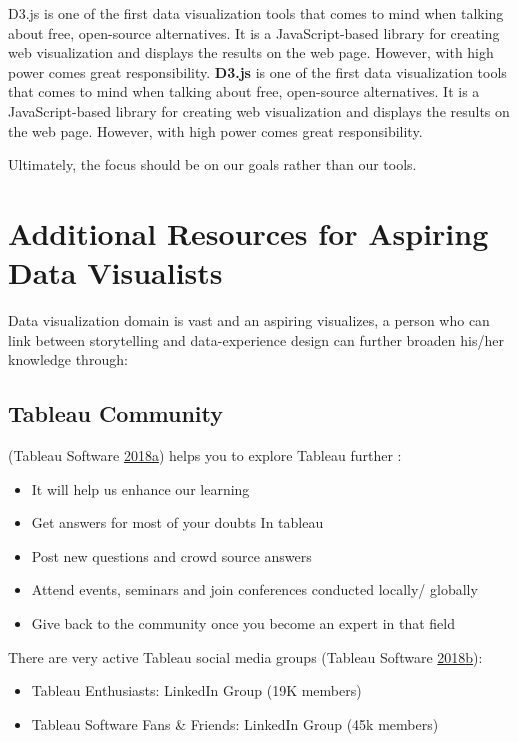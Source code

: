 \documentclass[]{book}
\providecommand{\tightlist}{%
  \setlength{\itemsep}{0pt}\setlength{\parskip}{0pt}}
\begin{document}
D3.js is one of the first data visualization tools that comes to mind
when talking about free, open-source alternatives. It is a
JavaScript-based library for creating web visualization and displays the
results on the web page. However, with high power comes great
responsibility. \textbf{D3.js} is one of the first data visualization
tools that comes to mind when talking about free, open-source
alternatives. It is a JavaScript-based library for creating web
visualization and displays the results on the web page. However, with
high power comes great responsibility.

Ultimately, the focus should be on our goals rather than our tools.

\section{Additional Resources for Aspiring Data
Visualists}\label{additional-resources-for-aspiring-data-visualists}

Data visualization domain is vast and an aspiring visualizes, a person
who can link between storytelling and data-experience design can further
broaden his/her knowledge through:

\subsection{Tableau Community}\label{tableau-community}

(Tableau Software
\protect\hyperlink{ref-Tableau_Community}{2018}\protect\hyperlink{ref-Tableau_Community}{a})
helps you to explore Tableau further :

\begin{itemize}
\tightlist
\item
  It will help us enhance our learning
\item
  Get answers for most of your doubts In tableau
\item
  Post new questions and crowd source answers
\item
  Attend events, seminars and join conferences conducted locally/
  globally
\item
  Give back to the community once you become an expert in that field
\end{itemize}

There are very active Tableau social media groups (Tableau Software
\protect\hyperlink{ref-LinkedIn_Groups}{2018}\protect\hyperlink{ref-LinkedIn_Groups}{b}):

\begin{itemize}
\tightlist
\item
  Tableau Enthusiasts: LinkedIn Group (19K members)
\item
  Tableau Software Fans \& Friends: LinkedIn Group (45k members)
\end{itemize}
\end{document}

